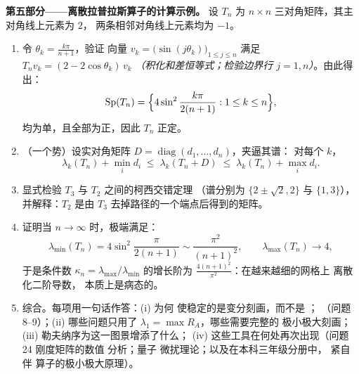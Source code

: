 \begin{problem}
\medskip
\noindent\textbf{第五部分——离散拉普拉斯算子的计算示例。}
设 $T_n$ 为 $n \times n$ 三对角矩阵，其主对角线上元素为 $2$，
两条相邻对角线上元素均为 $-1$。
\begin{enumerate}[resume]
  \item 令 $\theta_k = \frac{k\pi}{n+1}$，验证
        向量 $v_k = \bigl(\sin(j\theta_k)\bigr)_{1\leq j\leq
        n}$ 满足 $T_nv_k = (2 - 2\cos\theta_k)\,v_k$
        \emph{（积化和差恒等式；检验边界行
        $j = 1, n$）}。由此得出：
        \[
        \operatorname{Sp}(T_n) = \Bigl\{4\sin^2
        \frac{k\pi}{2(n+1)} : 1 \leq k \leq n\Bigr\},
        \]
        均为单，且全部为正，因此 $T_n$ 正定。
  \item （一个势）设实对角矩阵 $D =
        \operatorname{diag}(d_1, \dots, d_n)$，夹逼其谱：
        对每个 $k$，
        \[
        \lambda_k(T_n) + \min_i d_i \;\leq\;
        \lambda_k(T_n + D) \;\leq\; \lambda_k(T_n) + \max_i
        d_i .
        \]
  \item 显式检验 $T_3$ 与 $T_2$ 之间的柯西交错定理
        （谱分别为 $\{2 \pm \sqrt2, 2\}$ 与 $\{1,
        3\}$），并解释：$T_2$ 是由 $T_3$
        去掉路径的一个端点后得到的矩阵。
  \item 证明当 $n \to
        \infty$ 时，极端满足：
        \[
        \lambda_{\min}(T_n) = 4\sin^2\frac{\pi}{2(n+1)}
        \sim \frac{\pi^2}{(n+1)^2},
        \qquad
        \lambda_{\max}(T_n) \to 4 ,
        \]
        于是条件数 $\kappa_n =
        \lambda_{\max}/\lambda_{\min}$ 的增长阶为
        $\frac{4(n+1)^2}{\pi^2}$：在越来越细的网格上
        离散化二阶导数，
        本质上是病态的。
  \item 综合。每项用一句话作答：(i) 为何
        使稳定的是变分刻画，而不是
        ；
        （问题 8--9）；(ii) 哪些问题只用了
        $\lambda_1 = \max R_A$，哪些需要完整的
        极小极大刻画；(iii) 勒夫纳序为这一图景增添了什么；
        (iv) 这些工具在何处再次出现（问题 24 刚度矩阵的数值
        分析；量子
        微扰理论；以及在本科三年级分册中，
        紧自伴
        算子的极小极大原理）。
\end{enumerate}
\end{problem}

